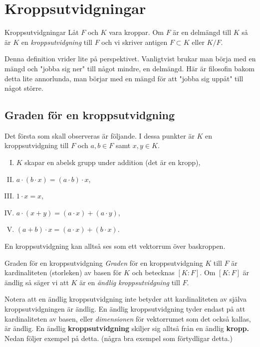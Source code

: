 \documentclass{article}
\theoremstyle{definition}
\begin{document}
\section{Kroppsutvidgningar}
\begin{mydef}{Kroppsutvidgningar}{}
  Låt $F$ och $K$ vara kroppar. Om $F$ är en delmängd till $K$ så är $K$ en \textit{kroppsutvidgning} till $F$ och vi skriver antigen $F \subset K$ eller $K/F$.
\end{mydef}
Denna definition vrider lite på perspektivet. Vanligtvist brukar man börja med en mängd och "jobba sig ner" till något mindre, en delmängd. Här är filosofin bakom detta lite 
annorlunda, man börjar med en mängd för att "jobba sig uppåt" till något större. 

\subsection{Graden för en kroppsutvidgning}
Det första som skall observeras är följande. I dessa punkter är $K$ en kroppsutvidgning till $F$ och $a, b \in F$ samt $x, y \in K$.

\begin{enumerate}[I)]
  \item $K$ skapar en abelsk grupp under addition (det är en kropp),
  \item $a \cdot (b \cdot x) = (a \cdot b) \cdot x$,
  \item $1 \cdot x = x$,
  \item $a \cdot (x + y) = (a \cdot x) + (a \cdot y)$,
  \item $(a + b) \cdot x = (a \cdot x) + (b \cdot x)$.
\end{enumerate}
En kroppsutvidgning kan alltså ses som ett vektorrum över baskroppen. 

\begin{mydef}{Graden för en kroppsutvidgning}{}
  \textit{Graden} för en kroppsutvidgning $K$ till $F$ är kardinaliteten (storleken) av basen för $K$ och betecknas $[K:F]$. Om $[K:F]$ är ändlig så 
  säger vi att $K$ är en \textit{ändlig kroppsutvidgning} till $F$. 
\end{mydef}
Notera att en ändlig kroppsutvidgning inte betyder att kardinaliteten av själva kroppsutvidgningen är ändlig. En ändlig kroppsutvidgning
tyder endast på att kardinaliteten av basen, eller \textit{dimensionen} för vektorrumet som det också kallas, är ändlig. En ändlig 
\textbf{kroppsutvidgning} skiljer sig alltså från en ändlig \textbf{kropp.}
Nedan följer exempel på detta.
(några bra exempel som förtydligar detta.) 
\end{document}
